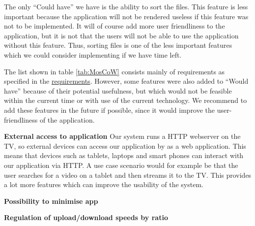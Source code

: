 The only ``Could have'' we have is the ability to sort the files. This feature is less 
important because the application will not be rendered useless
if this feature was not to be implemented. It will of course add more user friendliness to 
the application, but it is not that the users
 will not be able to use the application without this feature. Thus, sorting files is one of 
 the less important features which we could consider
 implementing if we have time left.
 
The list shown in table \ref{tab:MosCoW} consists mainly of requirements as specified in the 
\hyperref[sec:requirements]{requirements}.
However, some features were also added to ``Would have'' because of their potential 
usefulness, but which would not be feasible within the current time or with use of the 
current technology. We recommend to add these features in the future if possible, since it 
would improve the user-friendliness of the application.

\textbf{External access to application}
Our system runs a HTTP webserver on the TV, so external devices can access our application by as a web application. This means that devices such as tablets, laptops and smart phones can interact with our application via HTTP. A use case scenario would for example be that the user searches for a video on a tablet and then streams it to the TV. This provides a lot more features which can improve the usability of the system.

\textbf{Possibility to minimise app}

\textbf{Regulation of upload/download speeds by ratio}